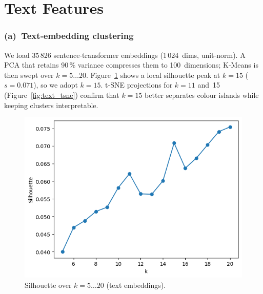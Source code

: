\documentclass{article}
\begin{document}
\maketitle



\section{Text Features}

\subsubsection{(a) Text‑embedding clustering}   %
We load 35\,826 sentence‑transformer embeddings (1\,024 dims, unit‑norm).  
A PCA that retains 90\,\% variance compresses them to 100 dimensions;  
K‑Means is then swept over $k=5\dots20$.  
Figure~\ref{fig:text_silhouette} shows a local silhouette peak at 
\mbox{$k=15$} ($s=0.071$), so we adopt \textbf{$k=15$}.  
t‑SNE projections for $k=11$ and 15 (Figure~\ref{fig:text_tsne}) confirm that  
$k=15$ better separates colour islands while keeping clusters interpretable.

\begin{figure}[h]
  \centering
  \includegraphics[width=.55\linewidth]{figs_tang/04_silhouette_k.png}
  \caption{Silhouette over $k=5\dots20$ (text embeddings).}
  \label{fig:text_silhouette}
\end{figure}
\end{document}
